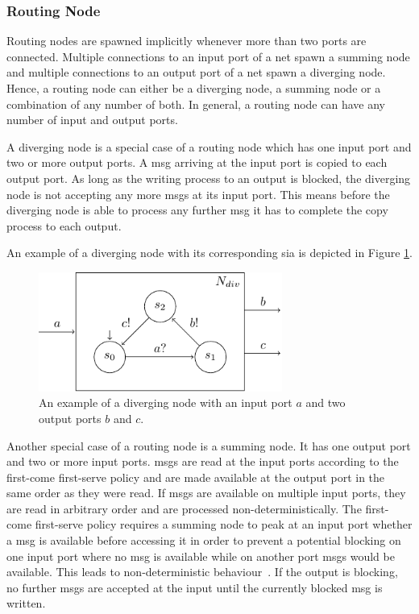 \subsubsection{Routing Node}
\label{sect_smx_box_implicit_flow}
Routing nodes are spawned implicitly whenever more than two ports are connected.
Multiple connections to an input port of a net spawn a summing node and multiple connections to an output port of a net spawn a diverging node.
Hence, a routing node can either be a diverging node, a summing node or a combination of any number of both.
In general, a routing node can have any number of input and output ports.

A diverging node is a special case of a routing node which has one input port and two or more output ports.
A \gls*{msg} arriving at the input port is copied to each output port.
As long as the writing process to an output is blocked, the diverging node is not accepting any more \glspl*{msg} at its input port.
This means before the diverging node is able to process any further \gls*{msg} it has to complete the copy process to each output.

An example of a diverging node with its corresponding \gls{sia} is depicted in Figure \ref{fig_smx_fc_div}.
\begin{figure}[bht]\begin{center}
\TopFigSpace
    \centering
    \includegraphics[width=8cm]{fig/sia_fc_div.pdf}
    \CaptionFigSpace
    \caption{An example of a diverging node with an input port $a$ and two output ports $b$ and $c$.}
    \label{fig_smx_fc_div}
\BotFigSpace
\end{center}\end{figure}

Another special case of a routing node is a summing node.
It has one output port and two or more input ports.
\Glspl*{msg} are read at the input ports according to the first-come first-serve policy and are made available at the output port in the same order as they were read.
If \glspl*{msg} are available on multiple input ports, they are read in arbitrary order and are processed non-deterministically.
The first-come first-serve policy requires a summing node to peak at an input port whether a \gls*{msg} is available before accessing it in order to prevent a potential blocking on one input port where no \gls*{msg} is available while on another port \glspl*{msg} would be available.
This leads to non-deterministic behaviour~\cite{kahn1974}.
If the output is blocking, no further \glspl*{msg} are accepted at the input until the currently blocked \gls*{msg} is written.


